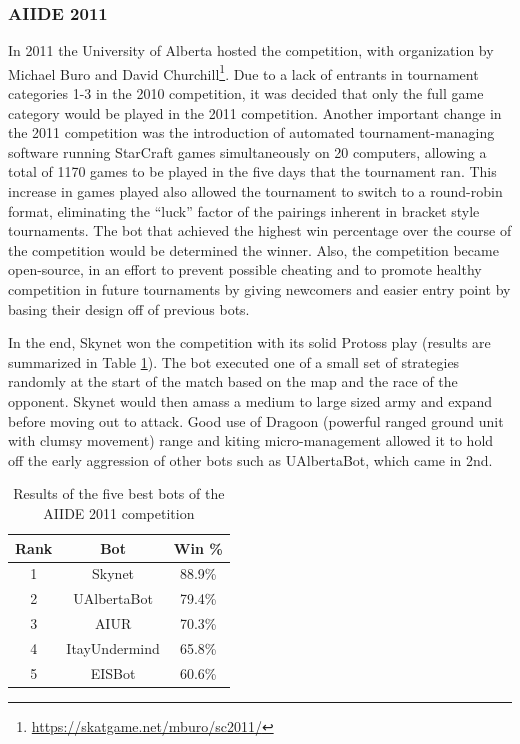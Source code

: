 \documentclass{llncs}
\begin{document}
\subsubsection{AIIDE 2011}

In 2011 the University of Alberta hosted the competition, with organization by Michael Buro and
David Churchill\footnote{\url{https://skatgame.net/mburo/sc2011/}}. Due to a lack of entrants in tournament categories 1-3 in the 2010 competition, it was
decided that only the full game category would be played in the 2011 competition. Another important
change in the 2011 competition was the introduction of automated tournament-managing software running
StarCraft games simultaneously on 20 computers, allowing a total of 1170 games to be played in the five days that the tournament ran. 
This increase in games played also allowed the tournament
to switch to a round-robin format, eliminating the ``luck'' factor of the pairings inherent in bracket
style tournaments. The bot that achieved the highest win percentage over the course of the competition would
be determined the winner. Also, the competition became open-source, in an effort 
to prevent possible cheating and to promote healthy competition in future tournaments by giving
newcomers and easier entry point by basing their design off of previous bots.

In the  end, Skynet  won the competition  with its solid  Protoss play
(results  are  summarized   in  Table  \ref{tab:aiide2011}).  The  bot
executed one of a small set of strategies randomly at the start of the
match based on the map and the race of the opponent. Skynet would then
amass a  medium to large  sized army and  expand before moving  out to
attack. Good  use of Dragoon (powerful ranged ground unit with clumsy movement) range and  kiting micro-management allowed
it to hold off the early aggression of other bots such as UAlbertaBot,
which came in 2nd.

\begin{table}[!b]
\caption{Results of the five best bots of the AIIDE 2011 competition}
\label{tab:aiide2011}
\centering
\begin{tabular}{|c|c|c|}
\hline
{\bfseries Rank} & {\bfseries Bot} & {\bfseries Win \%} \\
\hline
1 & Skynet & 88.9\% \\
2 & UAlbertaBot & 79.4\% \\
3 & AIUR & 70.3\% \\
4 & ItayUndermind & 65.8\% \\
5 & EISBot & 60.6\% \\
\hline
\end{tabular}
\end{table}
\end{document}
